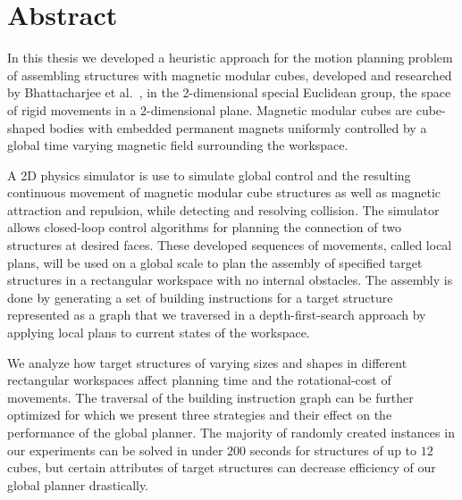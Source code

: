 \chapter*{Abstract}

In this thesis we developed a heuristic approach for the motion planning problem of assembling structures with magnetic modular cubes, developed and researched by Bhattacharjee et al.\ \cite{Bhattacharjee2022}, in the 2-dimensional special Euclidean group, the space of rigid movements in a 2-dimensional plane.
Magnetic modular cubes are cube-shaped bodies with embedded permanent magnets uniformly controlled by a global time varying magnetic field surrounding the workspace.

A 2D physics simulator is use to simulate global control and the resulting continuous movement of magnetic modular cube structures as well as magnetic attraction and repulsion, while detecting and resolving collision.
The simulator allows closed-loop control algorithms for planning the connection of two structures at desired faces.
These developed sequences of movements, called local plans, will be used on a global scale to plan the assembly of specified target structures in a rectangular workspace with no internal obstacles.
The assembly is done by generating a set of building instructions for a target structure represented as a graph that we traversed in a depth-first-search approach by applying local plans to current states of the workspace.

We analyze how target structures of varying sizes and shapes in different rectangular workspaces affect planning time and the rotational-cost of movements.
The traversal of the building instruction graph can be further optimized for which we present three strategies and their effect on the performance of the global planner.
The majority of randomly created instances in our experiments can be solved in under $200$ seconds for structures of up to $12$ cubes, but certain attributes of target structures can decrease efficiency of our global planner drastically.